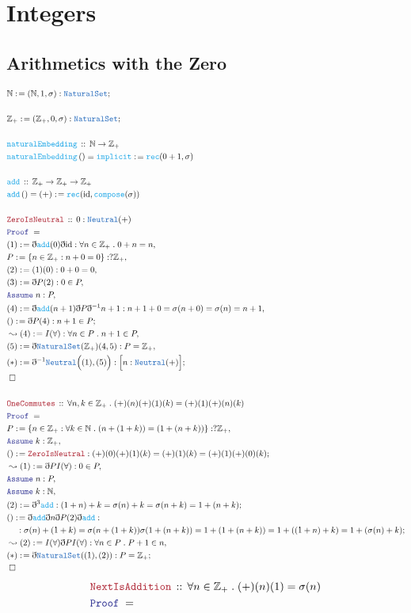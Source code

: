 \documentclass[12pt]{scrartcl}
\newcommand{\TYPE}[1]{\textcolor{NavyBlue}{\mathtt{#1}}}
\newcommand{\FUNC}[1]{\textcolor{Cerulean}{\mathtt{#1}}}
\newcommand{\LOGIC}[1]{\textcolor{Blue}{\mathtt{#1}}}
\newcommand{\THM}[1]{\textcolor{Maroon}{\mathtt{#1}}}
\renewcommand{\.}{\; . \;}
\newcommand{\de}{: \kern 0.1pc =}
\newcommand{\Act}[1]{\left( #1 \right)}
\newcommand{\Theorem}[2]{& \THM{#1} \, :: \, #2 \\ & \Proof = \\ }
\newcommand{\DeclareFunc}[2]{& \FUNC{#1} \, :: \, #2 \\}
\newcommand{\DefineNamedFunc}[4]{&  \FUNC{#1}\Act{#2} = #3 \de #4 \\}
\newcommand{\NewLine}{\\ & \kern 1pc}
\newcommand{\Page}[1]{ \begin{align*} #1 \end{align*}   }
\newcommand{ \bd }{ \ByDef }
\newcommand{\Int}{\mathbb{Z} }
\newcommand{\Nat}{\mathbb{N} }
\newcommand{\Say}[3]{& #1 \de #2 : #3, \\}
\newcommand{\Conclude}[3]{& #1 \de #2 : #3; \\}
\newcommand{\Derive}[3]{& \leadsto #1 \de #2 : #3, \\}
\newcommand{\Assume}[2]{& \LOGIC{Assume} \; #1 : #2, \\}
\newcommand{\QED}{\; \square}
\newcommand{\EndProof}{& \QED \\}
\newcommand{\ByDef}{\eth}
\newcommand{\Proof}{\LOGIC{Proof} \; }
\begin{document}
\section{Integers}
\subsection{Arithmetics with the Zero}
\Page{
	\Conclude{\Nat}{(\Nat,1,\sigma)}{\TYPE{NaturalSet}}
	\\
	\Conclude{\Int_+}{(\Int_+,0,\sigma)}{\TYPE{NaturalSet}}
	\\
	\DeclareFunc{naturalEmbedding}{\Nat \to \Int_+}
	\DefineNamedFunc{naturalEmbedding}{}{\FUNC{implicit}}{\FUNC{rec}(0+1, \sigma)}
	\\
	\DeclareFunc{add}{\Int_+ \to \Int_+ \to \Int_+}
	\DefineNamedFunc{add}{}{(+)}{ \FUNC{rec}( \mathrm{id}, \FUNC{compose}(\sigma))  }
	\\
	\Theorem{ZeroIsNeutral}{0 : \TYPE{Neutral}(+)}
	\Say{(1)}{\bd \FUNC{add}(0)\bd \mathrm{id}}{\forall n \in \Int_+ \. 0 + n = n}
	\Say{P}{\{ n \in \Int_+ : n + 0 = 0 \}}{?\Int_+}
	\Say{(2)}{(1)(0)}{ 0 + 0 = 0}
	\Say{(3)}{\bd P(2)}{0 \in P}
	\Assume{n}{P}
	\Say{(4)}{\bd \FUNC{add}(n + 1)\bd P \bd^{-1} n + 1}{  n + 1  + 0 =  \sigma(n + 0) = \sigma(n) = n + 1  }
	\Conclude{()}{\bd P (4)}{n + 1 \in P}
	\Derive{(4)}{I(\forall)}{\forall n \in P \. n + 1 \in P}
	\Say{(5)}{\bd \TYPE{NaturalSet}(\Int_+)(4,5)}{ P = \Int_+ }
	\Conclude{(*)}{\bd^{-1} \TYPE{Neutral}\Big((1),(5)\Big)}{\Big[ n : \TYPE{Neutral}(+) \Big]}
	\EndProof
	\\
	\Theorem{OneCommutes}{\forall n,k \in \Int_+ \. (+)(n)(+)(1)(k) = (+)(1)(+)(n)(k)}
	\Say{P}{\{ n \in \Int_+ : \forall k \in \Nat \. (n + (1 + k)) = (1 + (n + k))  \}}{?\Int_+}
	\Assume{k}{\Int_+ }
	\Conclude{()}{\THM{ZeroIsNeutral}}{(+)(0)(+)(1)(k) = (+)(1)(k) = (+)(1)(+)(0)(k)}
	\Derive{(1)}{\bd P I(\forall)}{0 \in P}
	\Assume{n}{P}
	\Assume{k}{\Nat}
	\Conclude{ (2)    }{ \bd^3 \FUNC{add}   }
	{                           
		(1 + n) + k     =
		\sigma(n)  + k    = 
		\sigma( n + k)  =
		1  + ( n + k)
	}
	\Conclude{()}{ \bd \FUNC{add} \bd n \bd P (2) \bd \FUNC{add}     }
	{	 
		\NewLine :
		\sigma(n)  + (1 + k) =  
		 \sigma(n + (1 + k) )
		 \sigma(1  +  (n  + k)) =
		 1   +  ( 1 + (n + k ) ) = 
                 1   +  ((1 + n ) + k )  =
		 1  + (\sigma(n) + k)  
	}
	\Derive{(2)}{I(\forall)\bd P I(\forall)}{ \forall n \in P \. P +1 \in n }
	\Conclude{(*)}{\bd \TYPE{NaturalSet}((1),(2))}{P = \Int_+}
	\EndProof
	}\Page{
	\Theorem{NextIsAddition}{\forall n \in \Int_+ \. (+)(n)(1) = \sigma(n)}
}
\end{document}
